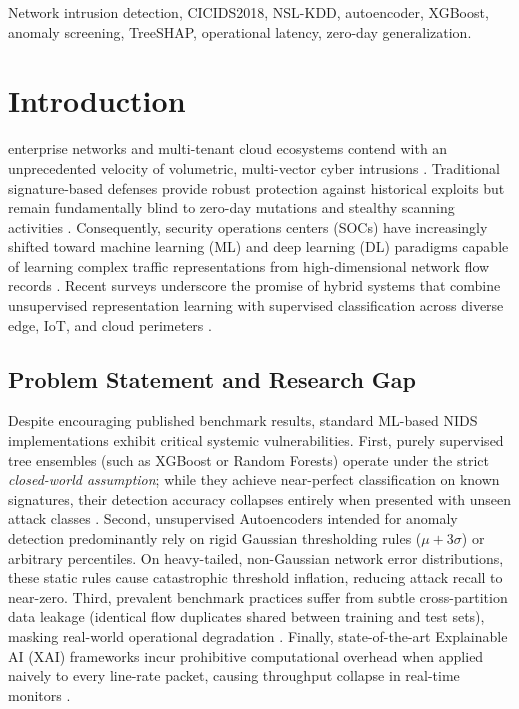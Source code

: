 \documentclass[journal]{IEEEtran}
\begin{document}
\begin{IEEEkeywords}
Network intrusion detection, CICIDS2018, NSL-KDD, autoencoder, XGBoost, anomaly screening, TreeSHAP, operational latency, zero-day generalization.
\end{IEEEkeywords}

\section{Introduction}
 enterprise networks and multi-tenant cloud ecosystems contend with an unprecedented velocity of volumetric, multi-vector cyber intrusions \cite{raza2024,abdallah2024,rm2023}. Traditional signature-based defenses provide robust protection against historical exploits but remain fundamentally blind to zero-day mutations and stealthy scanning activities \cite{ahmed2025,markevych2023,sowmya2023}. Consequently, security operations centers (SOCs) have increasingly shifted toward machine learning (ML) and deep learning (DL) paradigms capable of learning complex traffic representations from high-dimensional network flow records \cite{diana2025,hozouri2025,ahmed2026}. Recent surveys underscore the promise of hybrid systems that combine unsupervised representation learning with supervised classification across diverse edge, IoT, and cloud perimeters \cite{kamal2026,alsubaei2025,mallidi2025,vinayaka2025}.

\subsection{Problem Statement and Research Gap}
Despite encouraging published benchmark results, standard ML-based NIDS implementations exhibit critical systemic vulnerabilities. First, purely supervised tree ensembles (such as XGBoost or Random Forests) operate under the strict \textit{closed-world assumption}; while they achieve near-perfect classification on known signatures, their detection accuracy collapses entirely when presented with unseen attack classes \cite{abdulganiyu2024,sajid2024}. Second, unsupervised Autoencoders intended for anomaly detection predominantly rely on rigid Gaussian thresholding rules ($\mu + 3\sigma$) or arbitrary percentiles. On heavy-tailed, non-Gaussian network error distributions, these static rules cause catastrophic threshold inflation, reducing attack recall to near-zero. Third, prevalent benchmark practices suffer from subtle cross-partition data leakage (identical flow duplicates shared between training and test sets), masking real-world operational degradation \cite{arcos2025,hussein2026}. Finally, state-of-the-art Explainable AI (XAI) frameworks incur prohibitive computational overhead when applied naively to every line-rate packet, causing throughput collapse in real-time monitors \cite{neupane2022,benncir2024,mahmoud2025}.
\end{document}
